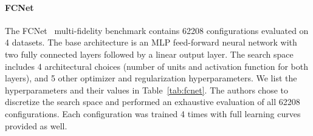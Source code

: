\paragraph{FCNet}
The FCNet~\cite{klein2019tabular} multi-fidelity benchmark contains 62208 configurations evaluated on 4 datasets. The base architecture is an MLP feed-forward neural network with two fully connected layers followed by a linear output layer. The search space includes 4 architectural choices (number of units and activation function for both layers), and 5 other optimizer and regularization hyperparameters. We list the hyperparameters and their values in Table~\ref{tab:fcnet}. The authors chose to discretize the search space and performed an exhaustive evaluation of all 62208 configurations. Each configuration was trained 4 times with full learning curves provided as well.
